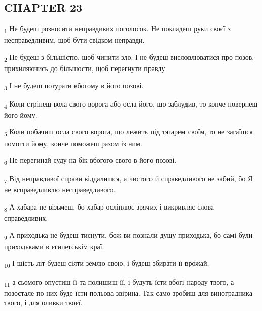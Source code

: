 \subsection{CHAPTER 23}
\begin{tcolorbox}
\textsubscript{1} Не будеш розносити неправдивих поголосок. Не покладеш руки своєї з несправедливим, щоб бути свідком неправди.
\end{tcolorbox}
\begin{tcolorbox}
\textsubscript{2} Не будеш з більшістю, щоб чинити зло. І не будеш висловлюватися про позов, прихиляючись до більшости, щоб перегнути правду.
\end{tcolorbox}
\begin{tcolorbox}
\textsubscript{3} І не будеш потурати вбогому в його позові.
\end{tcolorbox}
\begin{tcolorbox}
\textsubscript{4} Коли стрінеш вола свого ворога або осла його, що заблудив, то конче повернеш його йому.
\end{tcolorbox}
\begin{tcolorbox}
\textsubscript{5} Коли побачиш осла свого ворога, що лежить під тягарем своїм, то не загаїшся помогти йому, конче поможеш разом із ним.
\end{tcolorbox}
\begin{tcolorbox}
\textsubscript{6} Не перегинай суду на бік вбогого свого в його позові.
\end{tcolorbox}
\begin{tcolorbox}
\textsubscript{7} Від неправдивої справи віддалишся, а чистого й справедливого не забий, бо Я не всправедливлю несправедливого.
\end{tcolorbox}
\begin{tcolorbox}
\textsubscript{8} А хабара не візьмеш, бо хабар осліплює зрячих і викривляє слова справедливих.
\end{tcolorbox}
\begin{tcolorbox}
\textsubscript{9} А приходька не будеш тиснути, бож ви познали душу приходька, бо самі були приходьками в єгипетськім краї.
\end{tcolorbox}
\begin{tcolorbox}
\textsubscript{10} І шість літ будеш сіяти землю свою, і будеш збирати її врожай,
\end{tcolorbox}
\begin{tcolorbox}
\textsubscript{11} а сьомого опустиш її та полишиш її, і будуть їсти вбогі народу твого, а позостале по них буде їсти польова звірина. Так само зробиш для виноградника твого, і для оливки твоєї.
\end{tcolorbox}
